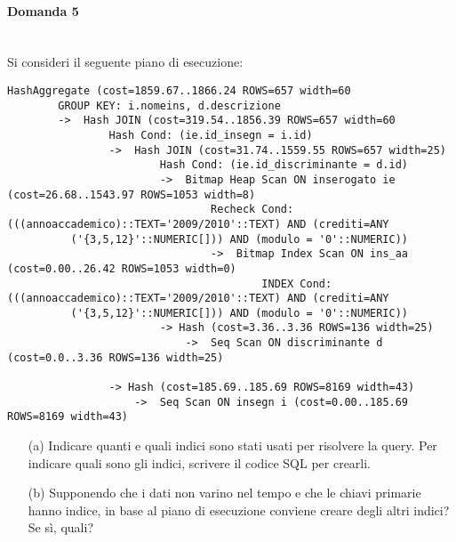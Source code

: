 \documentclass[a4paper, 10pt, titlepage]{article}
\begin{document}
\paragraph{Domanda 5}\dotfill
\\Si consideri il seguente piano di esecuzione:
\begin{scriptsize}
\begin{lstlisting}[tabsize=2]
	HashAggregate (cost=1859.67..1866.24 ROWS=657 width=60
		GROUP KEY: i.nomeins, d.descrizione
		->	Hash JOIN (cost=319.54..1856.39 ROWS=657 width=60
				Hash Cond: (ie.id_insegn = i.id)
				->	Hash JOIN (cost=31.74..1559.55 ROWS=657 width=25)
						Hash Cond: (ie.id_discriminante = d.id)
						->	Bitmap Heap Scan ON inserogato ie (cost=26.68..1543.97 ROWS=1053 width=8)
								Recheck Cond: (((annoaccademico)::TEXT='2009/2010'::TEXT) AND (crediti=ANY
		  ('{3,5,12}'::NUMERIC[])) AND (modulo = '0'::NUMERIC))
		  						->	Bitmap Index Scan ON ins_aa (cost=0.00..26.42 ROWS=1053 width=0)
		  								INDEX Cond: (((annoaccademico)::TEXT='2009/2010'::TEXT) AND (crediti=ANY
		  ('{3,5,12}'::NUMERIC[])) AND (modulo = '0'::NUMERIC))
		  				-> Hash (cost=3.36..3.36 ROWS=136 width=25)
		  					->	Seq Scan ON discriminante d (cost=0.0..3.36 ROWS=136 width=25)
		  					
		  		-> Hash (cost=185.69..185.69 ROWS=8169 width=43)
		  			->	Seq Scan ON insegn i (cost=0.00..185.69 ROWS=8169 width=43) 
\end{lstlisting}
\end{scriptsize}

\begin{itemize}
\item[(a)] Indicare quanti e quali indici sono stati usati per risolvere la query. Per indicare quali sono gli indici, scrivere il codice SQL per crearli.
\item[(b)] Supponendo che i dati non varino nel tempo e che le chiavi primarie hanno indice, in base al piano di esecuzione conviene creare degli altri indici? Se sì, quali?
\end{itemize}
\end{document}
